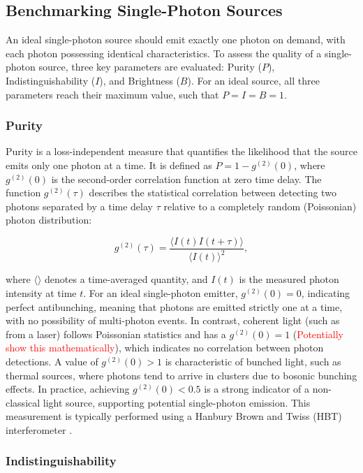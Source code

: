 \subsection{Benchmarking Single-Photon Sources}

An ideal single-photon source should emit exactly one photon on demand, with each photon possessing identical characteristics. To assess the quality of a single-photon source, three key parameters are evaluated: Purity ($P$), Indistinguishability ($I$), and Brightness ($B$). For an ideal source, all three parameters reach their maximum value, such that $ P = I = B = 1 $.

\subsubsection{\label{sec:purity} Purity}
Purity is a loss-independent measure that quantifies the likelihood that the source emits only one photon at a time. It is defined as $P = 1 - g^{(2)}(0)$, where $g^{(2)}(0)$ is the second-order correlation function at zero time delay. The function $g^{(2)}(\tau)$ describes the statistical correlation between detecting two photons separated by a time delay $\tau$ relative to a completely random (Poissonian) photon distribution:

\begin{equation}
    g^{(2)}(\tau) = \frac{\langle I(t)I(t+\tau)\rangle}{\langle I(t)\rangle^2},
    \label{eqn:g2}
\end{equation}

where $\langle \rangle$ denotes a time-averaged quantity, and $I(t)$ is the measured photon intensity at time $t$. For an ideal single-photon emitter, $g^{(2)}(0) = 0$, indicating perfect antibunching, meaning that photons are emitted strictly one at a time, with no possibility of multi-photon events. In contrast, coherent light (such as from a laser) follows Poissonian statistics and has a $g^{(2)}(0) = 1$ (\textcolor{red}{Potentially show this mathematically}), which indicates no correlation between photon detections. A value of $g^{(2)}(0) > 1$ is characteristic of bunched light, such as thermal sources, where photons tend to arrive in clusters due to bosonic bunching effects. In practice, achieving $g^{(2)}(0) < 0.5$ is a strong indicator of a non-classical light source, supporting potential single-photon emission. This measurement is typically performed using a Hanbury Brown and Twiss (HBT) interferometer \cite{Brown1956}.

\subsubsection{Indistinguishability}

